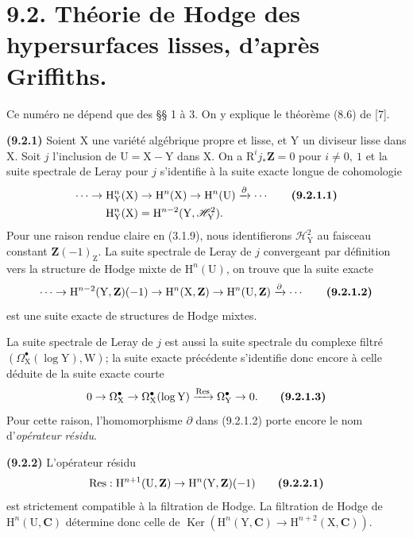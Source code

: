 \documentclass[11pt,leqno]{article}
\begin{document}
\section*{9.2. Théorie de Hodge des hypersurfaces lisses, d’après Griffiths.}

Ce numéro ne dépend que des §§ 1 à 3. On y explique le théorème (8.6) de [7].

\textbf{(9.2.1)} Soient \(\mathrm{X}\) une variété algébrique propre et lisse, et \(\mathrm{Y}\) un diviseur lisse dans \(\mathrm{X}\). Soit \(j\) l’inclusion de \(\mathrm{U}=\mathrm{X}-\mathrm{Y}\) dans \(\mathrm{X}\). On a \(\mathrm{R}^{i}j_{*}\mathbf{Z}=0\) pour \(i\neq0,\ 1\) et la suite spectrale de Leray pour \(j\) s’identifie à la suite exacte longue de cohomologie
\begin{align*}
\cdots\to\mathrm{H}_{\mathrm{Y}}^{n}(\mathrm{X})
&\to\mathrm{H}^{n}(\mathrm{X})
\to\mathrm{H}^{n}(\mathrm{U})
\xrightarrow{\partial}\cdots
\tag*{\textbf{(9.2.1.1)}}\\
\mathrm{H}_{\mathrm{Y}}^{n}(\mathrm{X})
&=\mathrm{H}^{n-2}(\mathrm{Y},\mathscr{H}_{\mathrm{Y}}^{2}).
\end{align*}
Pour une raison rendue claire en (3.1.9), nous identifierons \(\mathscr{H}_{\mathrm{Y}}^{2}\) au faisceau constant \(\mathbf{Z}(-1)_{\mathrm{Z}}\). La suite spectrale de Leray de \(j\) convergeant par définition vers la structure de Hodge mixte de \(\mathrm{H}^{n}(\mathrm{U})\), on trouve que la suite exacte
\[
\cdots\to
\mathrm{H}^{n-2}(\mathrm{Y},\mathbf{Z})(-1)
\to\mathrm{H}^{n}(\mathrm{X},\mathbf{Z})
\to\mathrm{H}^{n}(\mathrm{U},\mathbf{Z})
\xrightarrow{\partial}\cdots
\tag*{\textbf{(9.2.1.2)}}
\]
est une suite exacte de structures de Hodge mixtes.

La suite spectrale de Leray de \(j\) est aussi la suite spectrale du complexe filtré \((\Omega_{\mathrm{X}}^{\bullet}(\log\mathrm{Y}),\mathrm{W})\); la suite exacte précédente s’identifie donc encore à celle déduite de la suite exacte courte
\[
0\to\Omega_{\mathrm{X}}^{\bullet}
\to\Omega_{\mathrm{X}}^{\bullet}(\log\mathrm{Y})
\xrightarrow{\operatorname{Res}}
\Omega_{\mathrm{Y}}^{\bullet}\to0.
\tag*{\textbf{(9.2.1.3)}}
\]
Pour cette raison, l’homomorphisme \(\partial\) dans (9.2.1.2) porte encore le nom d’\textit{opérateur résidu}.

\textbf{(9.2.2)} L’opérateur résidu
\[
\operatorname{Res}:\mathrm{H}^{n+1}(\mathrm{U},\mathbf{Z})
\to\mathrm{H}^{n}(\mathrm{Y},\mathbf{Z})(-1)
\tag*{\textbf{(9.2.2.1)}}
\]
est strictement compatible à la filtration de Hodge. La filtration de Hodge de \(\mathrm{H}^{n}(\mathrm{U},\mathbf{C})\) détermine donc celle de \(\operatorname{Ker}(\mathrm{H}^{n}(\mathrm{Y},\mathbf{C})\to\mathrm{H}^{n+2}(\mathrm{X},\mathbf{C}))\).
\end{document}
